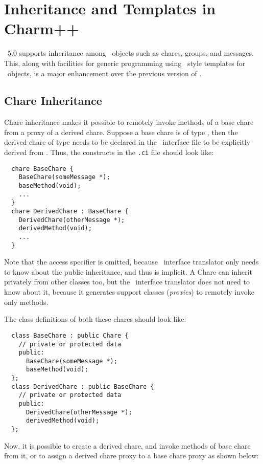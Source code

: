 \chapter{Inheritance and Templates in Charm++}
\label{inheritance and templates}

\charmpp\ 5.0 supports inheritance among \charmpp\ objects such as
chares, groups, and messages. This, along with facilities for generic
programming using \CC\ style templates for \charmpp\ objects, is a
major enhancement over the previous version of \charmpp.

\section{Chare Inheritance}
Chare inheritance makes it possible to remotely invoke methods of a base
chare  from a proxy of a derived
chare. Suppose a base chare is of type 
, then the derived chare of type  needs to be
declared in the \charmpp\ interface file to be explicitly derived from
. Thus, the constructs in the {\tt .ci} file should look like:

\begin{verbatim}
  chare BaseChare {
    BaseChare(someMessage *);
    baseMethod(void);
    ...
  }
  chare DerivedChare : BaseChare {
    DerivedChare(otherMessage *);
    derivedMethod(void);
    ...
  }
\end{verbatim}

Note that the access specifier  is omitted, because \charmpp\
interface translator only needs to know about the public inheritance,
and thus \kw{public} is implicit. A Chare can inherit privately from other
classes too, but the \charmpp\ interface translator does not need to know
about it, because it generates support classes ({\em proxies}) to remotely
invoke only \kw{public} methods.

The class definitions of both these chares should look like:

\begin{verbatim}
  class BaseChare : public Chare {
    // private or protected data
    public:
      BaseChare(someMessage *);
      baseMethod(void);
  };
  class DerivedChare : public BaseChare {
    // private or protected data
    public:
      DerivedChare(otherMessage *);
      derivedMethod(void);
  };
\end{verbatim}

Now, it is possible to create a derived chare, and invoke methods of base
chare from it, or to assign a derived chare proxy to a base chare proxy
as shown below:

